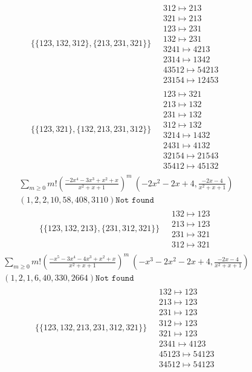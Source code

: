 \begin{scriptsize}
\begin{align}
\begin{matrix}
\end{matrix}
\\
\{\{123, 132, 312\}, \{213, 231, 321\}\}
\ 
&
\begin{matrix}
312 \mapsto 213\\321 \mapsto 213\\123 \mapsto 231\\132 \mapsto 231\\3241 \mapsto 4213\\2314 \mapsto 1342\\43512 \mapsto 54213\\23154 \mapsto 12453
\end{matrix}
\\
\{\{123, 321\}, \{132, 213, 231, 312\}\}
\ 
&
\begin{matrix}
123 \mapsto 321\\213 \mapsto 132\\231 \mapsto 132\\312 \mapsto 132\\3214 \mapsto 1432\\2431 \mapsto 4132\\32154 \mapsto 21543\\35412 \mapsto 45132
\end{matrix}
\end{align}
$$
\begin{matrix}
\sum_{m \geq 0} m! \left(
\frac{-2 x^{4} - 3 x^{3} + x^{2} + x}{x^{2} + x + 1}
\right)^m
\ 
\left(-2 x^{2} - 2 x + 4, \frac{-2 x - 4}{x^{2} + x + 1}\right)
\\
\left(1, 2, 2, 10, 58, 408, 3110\right)
\texttt{Not found}
\end{matrix}
$$
\begin{align}
\{\{123, 132, 213\}, \{231, 312, 321\}\}
\ 
&
\begin{matrix}
132 \mapsto 123\\213 \mapsto 123\\231 \mapsto 321\\312 \mapsto 321
\end{matrix}
\end{align}
$$
\begin{matrix}
\sum_{m \geq 0} m! \left(
\frac{-x^{5} - 3 x^{4} - 4 x^{3} + x^{2} + x}{x^{2} + x + 1}
\right)^m
\ 
\left(-x^{3} - 2 x^{2} - 2 x + 4, \frac{-2 x - 4}{x^{2} + x + 1}\right)
\\
\left(1, 2, 1, 6, 40, 330, 2664\right)
\texttt{Not found}
\end{matrix}
$$
\begin{align}
\{\{123, 132, 213, 231, 312, 321\}\}
\ 
&
\begin{matrix}
132 \mapsto 123\\213 \mapsto 123\\231 \mapsto 123\\312 \mapsto 123\\321 \mapsto 123\\2341 \mapsto 4123\\45123 \mapsto 54123\\34512 \mapsto 54123
\end{matrix}
\end{align}
\end{scriptsize}
